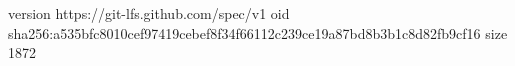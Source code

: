 version https://git-lfs.github.com/spec/v1
oid sha256:a535bfc8010cef97419cebef8f34f66112c239ce19a87bd8b3b1c8d82fb9cf16
size 1872
